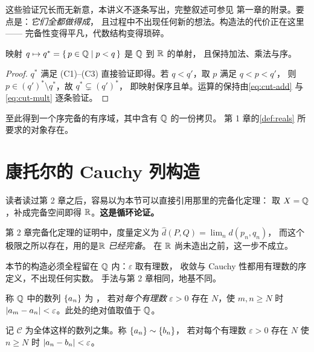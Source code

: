 \begin{remark}
  这些验证冗长而无新意，本讲义不逐条写出，完整叙述可参见
  \textcite{rudin1976} 第一章的附录。要点是：\emph{它们全都做得成}，
  且过程中不出现任何新的想法。构造法的代价正在这里——
  完备性变得平凡，代数结构变得琐碎。
\end{remark}

\begin{proposition}[有理数的嵌入]
  \label{prop:q-embed}
  映射 \(q \mapsto q^{*} = \left\{\,p \in \mathbb{Q} \;\middle|\; p < q\,\right\}\) 是 \(\mathbb{Q}\) 到 \(\mathbb{R}\) 的单射，
  且保持加法、乘法与序。
\end{proposition}

\begin{proof}
  \(q^{*}\) 满足 (C1)--(C3) 直接验证即得。若 \(q < q'\)，取 \(p\) 满足 \(q < p < q'\)，
  则 \(p \in (q')^{*} \setminus q^{*}\)，故 \(q^{*} \subsetneq (q')^{*}\)，
  即映射保序且单。运算的保持由\cref{eq:cut-add} 与\cref{eq:cut-mult} 逐条验证。
\end{proof}

至此得到一个序完备的有序域，其中含有 \(\mathbb{Q}\) 的一份拷贝。
第 1 章的\cref{def:reals} 所要求的对象存在。

\section{康托尔的 Cauchy 列构造}
\label{sec:cantor}

\begin{pitfall}[本节最要紧的一处]
  读者读过第 2 章之后，容易以为本节可以直接引用那里的完备化定理：
  取 \(X = \mathbb{Q}\)，补成完备空间即得 \(\mathbb{R}\)。\textbf{这是循环论证。}

  第 2 章完备化定理的证明中，度量定义为
  \(\widehat{d}(P,Q) = \lim_{n} d(p_{n},q_{n})\)，
  而这个极限之所以存在，用的是\emph{\(\mathbb{R}\) 已经完备}。
  在 \(\mathbb{R}\) 尚未造出之前，这一步不成立。

  本节的构造必须全程留在 \(\mathbb{Q}\) 内：\(\varepsilon\) 取有理数，
  收敛与 Cauchy 性都用有理数的序定义，不出现任何实数。
  手法与第 2 章相同，地基不同。
\end{pitfall}

\begin{definition}[有理 Cauchy 列]
  \label{def:rational-cauchy}
  称 \(\mathbb{Q}\) 中的数列 \(\{a_{n}\}\) 为 ，
  若对\emph{每个有理数} \(\varepsilon > 0\) 存在 \(N\)，使 \(m,n \ge N\) 时
  \(\lvert a_{m}-a_{n}\rvert < \varepsilon\)。此处的绝对值取值于 \(\mathbb{Q}\)。

  记 \(\mathcal{C}\) 为全体这样的数列之集。称 \(\{a_{n}\} \sim \{b_{n}\}\)，
  若对每个有理数 \(\varepsilon>0\) 存在 \(N\) 使 \(n \ge N\) 时
  \(\lvert a_{n}-b_{n}\rvert < \varepsilon\)。
\end{definition}

